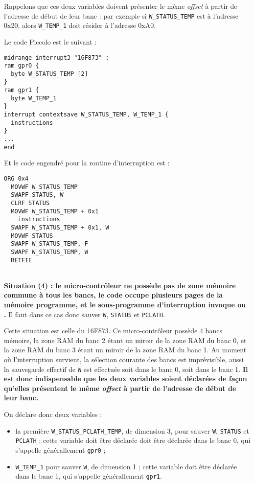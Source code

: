 Rappelons que ces deux variables doivent présenter le même \emph{offset} à partir de l'adresse de début de leur banc : par exemple si \texttt{W\_STATUS\_TEMP} est à l'adresse 0x20, alors \texttt{W\_TEMP\_1} doit résider à l'adresse 0xA0.

Le code Piccolo est le suivant :
\begin{lstlisting}[language=piccolo]
midrange interrupt3 "16F873" :
ram gpr0 {
  byte W_STATUS_TEMP [2]
}
ram gpr1 {
  byte W_TEMP_1
}
interrupt contextsave W_STATUS_TEMP, W_TEMP_1 {
  instructions
}
...
end
\end{lstlisting}

Et le code engendré pour la routine d'interruption est :
\begin{lstlisting}[language=assembleur]
  ORG 0x4
  MOVWF W_STATUS_TEMP
  SWAPF STATUS, W
  CLRF STATUS
  MOVWF W_STATUS_TEMP + 0x1
    instructions
  SWAPF W_STATUS_TEMP + 0x1, W
  MOVWF STATUS
  SWAPF W_STATUS_TEMP, F
  SWAPF W_STATUS_TEMP, W
  RETFIE
\end{lstlisting}





~\\
\textbf{Situation (4) : le micro-contrôleur ne possède pas de zone mémoire commune à tous les bancs, le code occupe plusieurs pages de la mémoire programme, et le sous-programme d'interruption invoque  ou .} Il faut dans ce cas donc sauver \texttt{W}, \texttt{STATUS} et \texttt{PCLATH}.

Cette situation est celle du 16F873. Ce micro-contrôleur possède 4 bancs mémoire, la zone RAM du banc 2 étant un miroir de la zone RAM du banc 0, et la zone RAM du banc 3 étant un miroir de la zone RAM du banc 1. Au moment où l'interruption survient, la sélection courante des bancs est imprévisible, aussi la sauvegarde effectif de \texttt{W} est effectuée soit dans le banc 0, soit dans le banc 1. \textbf{Il est donc indispensable que les deux variables soient déclarées de façon qu'elles présentent le même \emph{offset} à partir de l'adresse de début de leur banc.}

On déclare donc deux variables :
\begin{itemize}
  \item la première \texttt{W\_STATUS\_PCLATH\_TEMP}, de dimension 3, pour sauver \texttt{W}, \texttt{STATUS} et \texttt{PCLATH} ; cette variable doit être déclarée doit être déclarée dans le banc 0, qui s'appelle générallement \texttt{gpr0} ; 
  \item \texttt{W\_TEMP\_1} pour sauver \texttt{W}, de dimension 1 ; cette variable doit être déclarée dans le banc 1, qui s'appelle générallement \texttt{gpr1}.

\end{itemize}

